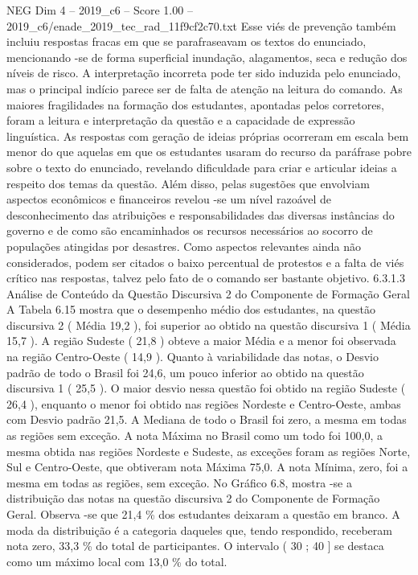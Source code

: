 \begin{textsample}{NEG Dim 4 – 2019\_c6 – Score 1.00 – 2019\_c6/enade\_2019\_tec\_rad\_11f9cf2c70.txt}
Esse viés de prevenção também incluiu respostas fracas em que se parafraseavam os textos do enunciado, mencionando -se de forma superficial inundação, alagamentos, seca e redução dos níveis de risco.
A interpretação incorreta pode ter sido induzida pelo enunciado, mas o principal indício parece ser de falta de atenção na leitura do comando.
As maiores fragilidades na formação dos estudantes, apontadas pelos corretores, foram a leitura e interpretação da questão e a capacidade de expressão linguística.
As respostas com geração de ideias próprias ocorreram em escala bem menor do que aquelas em que os estudantes usaram do recurso da paráfrase pobre sobre o texto do enunciado, revelando dificuldade para criar e articular ideias a respeito dos temas da questão.
Além disso, pelas sugestões que envolviam aspectos econômicos e financeiros revelou -se um nível razoável de desconhecimento das atribuições e responsabilidades das diversas instâncias do governo e de como são encaminhados os recursos necessários ao socorro de populações atingidas por desastres.
Como aspectos relevantes ainda não considerados, podem ser citados o baixo percentual de protestos e a falta de viés crítico nas respostas, talvez pelo fato de o comando ser bastante objetivo. 6.3.1.3 Análise de Conteúdo da Questão Discursiva 2 do Componente de Formação Geral A Tabela 6.15 mostra que o desempenho médio dos estudantes, na questão discursiva 2 ( Média 19,2 ), foi superior ao obtido na questão discursiva 1 ( Média 15,7 ).
A região Sudeste ( 21,8 ) obteve a maior Média e a menor foi observada na região Centro-Oeste ( 14,9 ).
Quanto à variabilidade das notas, o Desvio padrão de todo o Brasil foi 24,6, um pouco inferior ao obtido na questão discursiva 1 ( 25,5 ).
O maior desvio nessa questão foi obtido na região Sudeste ( 26,4 ), enquanto o menor foi obtido nas regiões Nordeste e Centro-Oeste, ambas com Desvio padrão 21,5.
A Mediana de todo o Brasil foi zero, a mesma em todas as regiões sem exceção.
A nota Máxima no Brasil como um todo foi 100,0, a mesma obtida nas regiões Nordeste e Sudeste, as exceções foram as regiões Norte, Sul e Centro-Oeste, que obtiveram nota Máxima 75,0.
A nota Mínima, zero, foi a mesma em todas as regiões, sem exceção.
No Gráfico 6.8, mostra -se a distribuição das notas na questão discursiva 2 do Componente de Formação Geral.
Observa -se que 21,4 \% dos estudantes deixaram a questão em branco.
A moda da distribuição é a categoria daqueles que, tendo respondido, receberam nota zero, 33,3 \% do total de participantes.
O intervalo ( 30 ; 40 ] se destaca como um máximo local com 13,0 \% do total.

\end{textsample}
